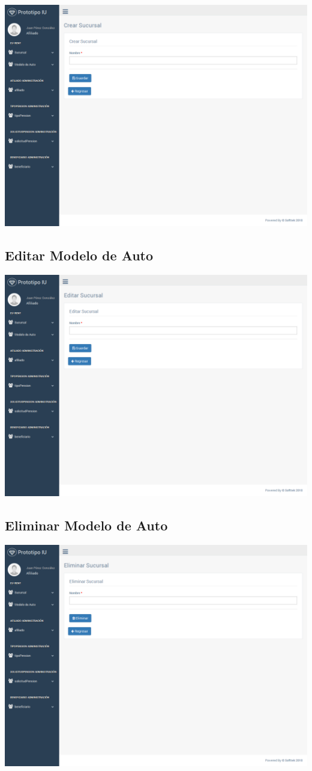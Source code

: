 \includegraphics[width=\linewidth]{ui-prototype/SucursalServices/CrearSucursalPage.png}

\subsection{Editar Modelo de Auto}

\includegraphics[width=\linewidth]{ui-prototype/SucursalServices/EditarSucursalPage.png}

\subsection{Eliminar Modelo de Auto}

\includegraphics[width=\linewidth]{ui-prototype/SucursalServices/EliminarSucursalPage.png}

%
